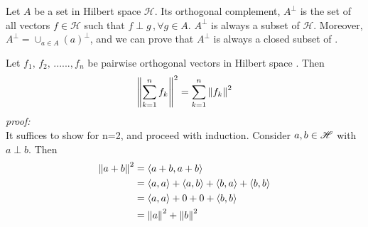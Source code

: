 \documentclass{article}
\begin{document}
\begin{definition}\rm\label{ortho comp}\nextline
	Let $A$ be a set in Hilbert space $\mathscr{H}$. Its orthogonal complement, $A^{\perp}$ is the set of all vectors $f \in \mathscr{H}$ such
	that $f\perp g\,,\forall g \in A$. $A^\perp$ is always a subset of $\mathscr{H}$. Moreover, $A^\perp=\cup_{a\in A}(a)^\perp$, and we can prove that $A^\perp$ is always a closed subset of \hbs.
\end{definition}

\begin{proposition}\rm\nextline
	Let $f_1,\,f_2,\,......,f_n$ be pairwise orthogonal vectors in Hilbert space \hbs. Then
	$$
		\left\|{\sum_{k=1}^n f_k}\right\|^2={\sum_{k=1}^n \left\|{f_k}\right\|^2}
	$$
	\textit{proof:}\\
	It suffices to show for n=2, and proceed with induction. Consider $a,b\in \mathscr{H}$ with $a\perp b$.
	Then
	\begin{equation}
		\begin{split}
			\left\|{a+b}\right\|^2&=\left<{a+b},{a+b}\right>\\
			&=\left<{a},{a}\right>+\left<{a},{b}\right>+\left<{b},{a}\right>+\left<{b},{b}\right>\\
			&=\left<{a},{a}\right>+0+0+\left<{b},{b}\right>\\
			&=\left\|{a}\right\|^2+\left\|{b}\right\|^2
		\end{split}
	\end{equation}


\end{proposition}
\end{document}
